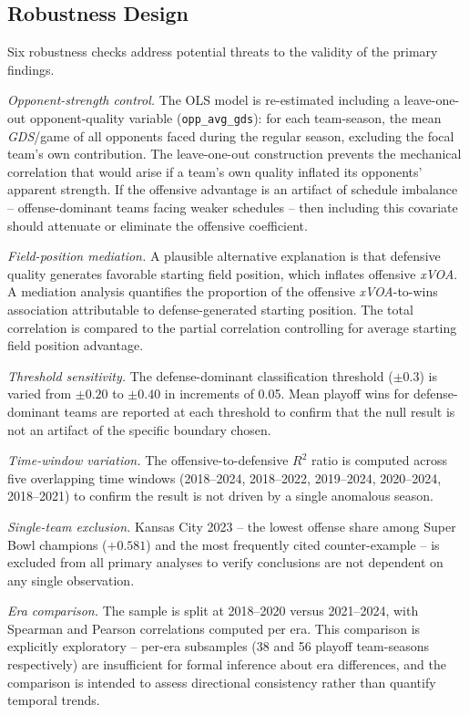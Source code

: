\documentclass[12pt,a4paper]{article}
\newcommand{\xvoa}{\textit{xVOA}}
\newcommand{\gds}{\textit{GDS}}
\begin{document}
\subsection{Robustness Design}
\label{sec:robustness-design}

Six robustness checks address potential threats to the validity of the primary findings.

\emph{Opponent-strength control.} The OLS model is re-estimated including a leave-one-out opponent-quality variable (\texttt{opp\_avg\_gds}): for each team-season, the mean \gds{}/game of all opponents faced during the regular season, excluding the focal team's own contribution. The leave-one-out construction prevents the mechanical correlation that would arise if a team's own quality inflated its opponents' apparent strength. If the offensive advantage is an artifact of schedule imbalance -- offense-dominant teams facing weaker schedules -- then including this covariate should attenuate or eliminate the offensive coefficient.

\emph{Field-position mediation.} A plausible alternative explanation is that defensive quality generates favorable starting field position, which inflates offensive \xvoa{}. A mediation analysis \citep{baron1986moderator} quantifies the proportion of the offensive \xvoa{}-to-wins association attributable to defense-generated starting position. The total correlation is compared to the partial correlation controlling for average starting field position advantage.

\emph{Threshold sensitivity.} The defense-dominant classification threshold ($\pm 0.3$) is varied from $\pm 0.20$ to $\pm 0.40$ in increments of 0.05. Mean playoff wins for defense-dominant teams are reported at each threshold to confirm that the null result is not an artifact of the specific boundary chosen.

\emph{Time-window variation.} The offensive-to-defensive $R^2$ ratio is computed across five overlapping time windows (2018--2024, 2018--2022, 2019--2024, 2020--2024, 2018--2021) to confirm the result is not driven by a single anomalous season.

\emph{Single-team exclusion.} Kansas City 2023 -- the lowest offense share among Super Bowl champions ($+0.581$) and the most frequently cited counter-example -- is excluded from all primary analyses to verify conclusions are not dependent on any single observation.

\emph{Era comparison.} The sample is split at 2018--2020 versus 2021--2024, with Spearman and Pearson correlations computed per era. This comparison is explicitly exploratory -- per-era subsamples (38 and 56 playoff team-seasons respectively) are insufficient for formal inference about era differences, and the comparison is intended to assess directional consistency rather than quantify temporal trends.
\end{document}
